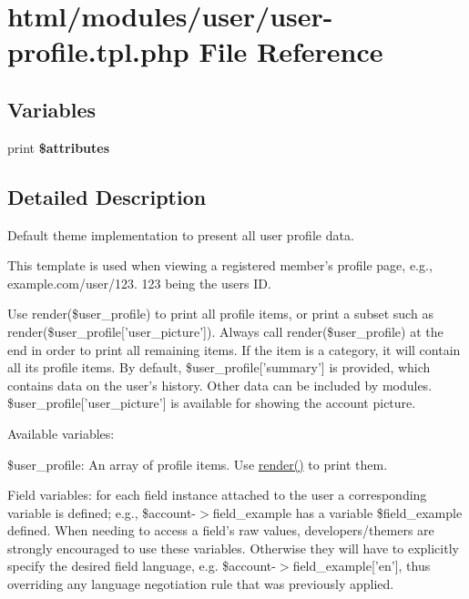 \hypertarget{user-profile_8tpl_8php}{
\section{html/modules/user/user-\/profile.tpl.php File Reference}
\label{user-profile_8tpl_8php}
}
\subsection*{Variables}
\begin{DoxyCompactItemize}
\item 
\hypertarget{user-profile_8tpl_8php_a9c88c4272fa40546577b45392a0b3cd3}{
print {\bfseries \$attributes}}
\label{user-profile_8tpl_8php_a9c88c4272fa40546577b45392a0b3cd3}

\end{DoxyCompactItemize}


\subsection{Detailed Description}
Default theme implementation to present all user profile data.

This template is used when viewing a registered member's profile page, e.g., example.com/user/123. 123 being the users ID.

Use render(\$user\_\-profile) to print all profile items, or print a subset such as render(\$user\_\-profile\mbox{[}'user\_\-picture'\mbox{]}). Always call render(\$user\_\-profile) at the end in order to print all remaining items. If the item is a category, it will contain all its profile items. By default, \$user\_\-profile\mbox{[}'summary'\mbox{]} is provided, which contains data on the user's history. Other data can be included by modules. \$user\_\-profile\mbox{[}'user\_\-picture'\mbox{]} is available for showing the account picture.

Available variables:
\begin{DoxyItemize}
\item \$user\_\-profile: An array of profile items. Use \hyperlink{common_8inc_a5f4b2009c1caf78549203cec9b324305}{render()} to print them.
\item Field variables: for each field instance attached to the user a corresponding variable is defined; e.g., \$account-\/$>$field\_\-example has a variable \$field\_\-example defined. When needing to access a field's raw values, developers/themers are strongly encouraged to use these variables. Otherwise they will have to explicitly specify the desired field language, e.g. \$account-\/$>$field\_\-example\mbox{[}'en'\mbox{]}, thus overriding any language negotiation rule that was previously applied.
\end{DoxyItemize}

